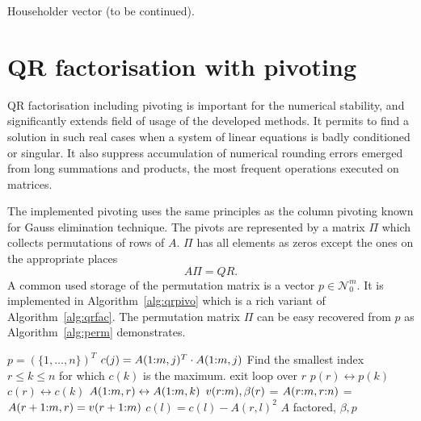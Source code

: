 \begin{refsection}
\begin{example}{Householder vector}
    (to be continued).
\end{example}


\section{QR factorisation with pivoting}

QR factorisation including pivoting is important for the numerical
stability, and significantly extends field of usage of the developed methods.
It permits to find a solution in such real cases when a system of linear
equations is badly conditioned or singular. It also suppress
accumulation of numerical rounding errors emerged from long summations
and products, the most frequent operations executed on matrices.

The implemented pivoting uses the same principles as the
column pivoting known for Gauss elimination technique. The pivots
are represented by a matrix $\Pi$ which collects permutations of rows of $A$.
$\Pi$ has all elements as zeros except the ones on the appropriate places
\begin{equation}
  A \Pi = Q R.
\end{equation}
A common used storage of the permutation matrix is a vector
$p \in \mathcal{N}_0^m$.
It is implemented in Algorithm~\ref{alg:qrpivo} which is
a rich variant of Algorithm~\ref{alg:qrfac}.
The permutation matrix $\Pi$ can be easy recovered from $p$ as
Algorithm~\ref{alg:perm} demonstrates.

\begin{algorithm}
  \caption{QR factorisation with column pivoting}
  \label{alg:qrpivo}
  \begin{algorithmic}
    \State {}
    \State {}
    \State {}
    \State $p = (\{1, \ldots, n \} )^T$
    \State $c(j) = A(1{:}m,j)^T \cdot A(1{:}m,j)$
    \EndFor
    \State Find the smallest index $r \le k \le n$ for which $c(k)$
    is the maximum.
    \State exit loop over $r$
    \EndIf
    \State $p(r) \leftrightarrow p(k)$
    \State $c(r) \leftrightarrow c(k)$
    \State $A(1{:}m,r) \leftrightarrow A(1{:}m,k)$
    \EndIf
    \State $v(r{:}m), \beta(r)$ = 
    \State $A(r{:}m,r{:}n)$ = 
    \State $A(r+1{:}m,r) = v(r+1{:}m)$
    \State $c(l) = c(l) - A(r,l)^2$
    \EndFor
    \EndFor
    \State \Return $A$ factored, $\beta,p$
    \EndFunction
  \end{algorithmic}
\end{algorithm}



\end{refsection}
